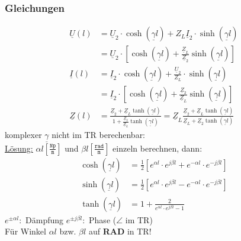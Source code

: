 \subsubsection{Gleichungen}
\begin{align*}
	\underline{U}(l)& = \underline{U}_2 \cdot \cosh(\underline{\gamma}l) + Z_L \underline{I}_2 \cdot \sinh(\underline{\gamma}l)\\
	& = \underline{U}_2 \cdot \left[ \cosh(\underline{\gamma} l) + \tfrac{\underline{Z}_L}{\underline{Z}_2} \sinh(\underline{\gamma} l) \right]\\
	\underline{I}(l)& = \underline{I}_2 \cdot \cosh(\underline{\gamma}l) + \frac{\underline{U}_2}{Z_L} \cdot \sinh(\underline{\gamma}l)\\
	& = \underline{I}_2 \cdot \left[ \cosh(\underline{\gamma} l) + \tfrac{\underline{Z}_2}{\underline{Z}_L} \sinh(\underline{\gamma} l) \right]\\
	\underline{Z}(l) & = \frac{\underline{Z}_2+ \underline{Z}_L\tanh(\underline{\gamma} 
		l)}{1+\frac{\underline{Z}_2}{\underline{Z}_L}\tanh(\underline{\gamma} l)} =
		\underline{Z}_L \frac{\underline{Z}_2+ \underline{Z}_L\tanh(\underline{\gamma} 
		l)}{{\underline{Z}_L}+{\underline{Z}_2}\tanh(\underline{\gamma} l)}
\end{align*}
komplexer $\underline{\gamma}$ nicht im TR berechenbar:\\
\underline{Lösung:} $\alpha l \left[ \tfrac{\texttt{Np}}{\texttt{m}} \right] $ und $ \beta l \left[ \tfrac{\texttt{rad}}{\texttt{m}} \right] $ einzeln berechnen, dann:
\begin{align*}
	\cosh(\underline{\gamma}l) &= \frac{1}{2} \left[e^{\alpha l} \cdot e^{j\beta l} + e^{-\alpha l} \cdot e^{-j\beta l} \right]\\
	\sinh (\underline{\gamma}l)&= \frac{1}{2} \left[e^{\alpha l} \cdot e^{j\beta l} - e^{-\alpha l} \cdot e^{-j\beta l} \right]\\
	\tanh(\underline{\gamma}l) &= 
	1+\frac{2}{e^{\alpha l} \cdot e^{j\beta l}-1}
\end{align*}
  $e^{\pm \alpha l }:$ Dämpfung \qquad $e^{\pm j\beta l}:$ Phase ($\angle$ im TR)\\
  Für Winkel $\alpha l$ bzw. $ \beta l$ auf \textbf{RAD} in TR!
